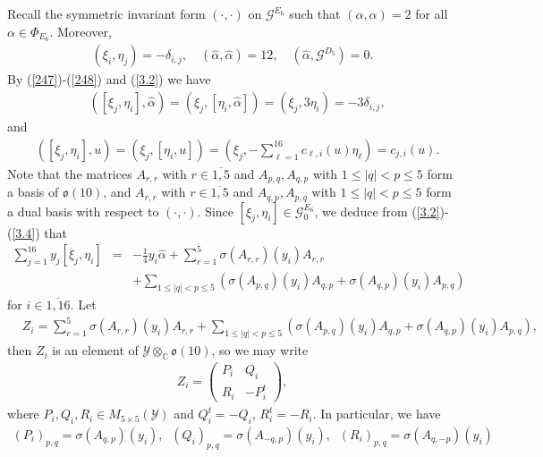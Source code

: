 \documentclass[12pt]{article}
\numberwithin{equation}{section}
\theoremstyle{definition}
\theoremstyle{remark}
\begin{document}
Recall the symmetric invariant form $(\cdot,\cdot)$ on $\mathscr{G}^{E_6}$ such that $(\alpha,\alpha)=2$ for all $\alpha\in\Phi_{E_6}$. Moreover,
\begin{eqnarray}
	(\xi_i,\eta_j)=-\delta_{i,j},\quad (\widehat{\alpha},\widehat{\alpha})=12,\quad (\widehat{\alpha},\mathscr{G}^{D_5})=0.\label{3.2}
\end{eqnarray}
By (\ref{247})-(\ref{248}) and (\ref{3.2}) we have
\begin{eqnarray}
	&([\xi_j,\eta_i],\widehat{\alpha})=(\xi_j,[\eta_i,\widehat{\alpha}])=(\xi_j,3\eta_i)=-3\delta_{i,j}, \label{3.3}
\end{eqnarray}
and
\begin{eqnarray}
	&([\xi_j,\eta_i],u)=(\xi_j,[\eta_i,u])=(\xi_j,-\sum\limits_{\ell=1}^{16}c_{\ell,i}(u)\eta_\ell)=c_{j,i}(u). \label{3.4}
\end{eqnarray}
Note that the matrices $A_{r,r}$ with $r\in\overline{1,5}$ and $A_{p,q},A_{q,p}$ with $1\leqslant |q|<p\leqslant 5$ form a basis of $\mathfrak{o}(10)$, and $A_{r,r}$ with $r\in\overline{1,5}$ and $A_{q,p},A_{p,q}$ with $1\leqslant |q|<p\leqslant 5$ form a dual basis with respect to $(\cdot,\cdot)$. Since $[\xi_j,\eta_i]\in\mathscr{G}^{E_6}_0$, we deduce from (\ref{3.2})-(\ref{3.4}) that
\begin{eqnarray}
	\sum\limits_{j=1}^{16}y_j[\xi_j,\eta_i]&=&-\frac{1}{4}y_i\widehat{\alpha}+\sum\limits_{r=1}^5\sigma(A_{r,r})(y_i)A_{r,r}\nonumber\\
	&&+\sum\limits_{1\leqslant |q|<p\leqslant 5} (\sigma(A_{p,q})(y_i)A_{q,p}+\sigma(A_{q,p})(y_i)A_{p,q}) \label{3.6}
\end{eqnarray}
for $i\in\overline{1,16}$. Let 
\begin{eqnarray}
	&Z_i=\sum\limits_{r=1}^5\sigma(A_{r,r})(y_i)A_{r,r}+\sum\limits_{1\leqslant |q|<p\leqslant 5} (\sigma(A_{p,q})(y_i)A_{q,p}+\sigma(A_{q,p})(y_i)A_{p,q}), \label{zi}
\end{eqnarray}
then $Z_i$ is an element of $\mathscr{Y}\otimes_{\mathbb{C}}\mathfrak{o}(10)$, so we may write
\begin{eqnarray}
	Z_i=\begin{pmatrix}
		P_i&Q_i\\R_i&-P_i^{t} \label{zi1}
	\end{pmatrix},
\end{eqnarray}
where $P_i,Q_i,R_i\in M_{5\times 5}(\mathscr{Y})$ and $Q_i^t=-Q_i$, $R_i^t=-R_i$. In particular, we have
\begin{eqnarray}
	(P_i)_{p,q}=\sigma(A_{q,p})(y_i),\;\;(Q_i)_{p,q}=\sigma(A_{-q,p})(y_i),\;\;(R_i)_{p,q}=\sigma(A_{q,-p})(y_i)
\end{eqnarray}
\end{document}

